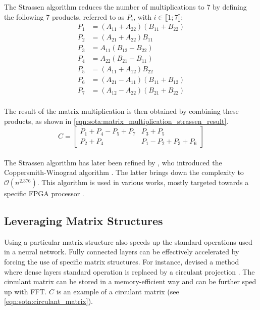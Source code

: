 \noindent The Strassen algorithm reduces the number of multiplications to 7 by
defining the following 7 products, referred to as $P_{i}$, with $i\in \llbracket
1;7 \rrbracket$:\\

\begin{equation}
  \label{eqn:sota:matrix_multiplication_strassen}
  \begin{aligned}
    P_{1} & = (A_{11} + A_{22})(B_{11} + B_{22}) \\
    P_{2} & = (A_{21} + A_{22})B_{11}            \\
    P_{3} & = A_{11}(B_{12} - B_{22})            \\
    P_{4} & = A_{22}(B_{21} - B_{11})            \\
    P_{5} & = (A_{11} + A_{12})B_{22}            \\
    P_{6} & = (A_{21} - A_{11})(B_{11} + B_{12}) \\
    P_{7} & = (A_{12} - A_{22})(B_{21} + B_{22})
  \end{aligned}
\end{equation}\\

\noindent The result of the matrix multiplication is then obtained by combining
these products, as shown in
\cref{eqn:sota:matrix_multiplication_strassen_result}.\\

\begin{equation}
  \label{eqn:sota:matrix_multiplication_strassen_result}
  C = \begin{bmatrix}
    P_{1} + P_{4} - P_{5} + P_{7} & P_{3} + P_{5}                 \\
    P_{2} + P_{4}                 & P_{1} - P_{2} + P_{3} + P_{6}
  \end{bmatrix}
\end{equation}\\

\noindent The Strassen algorithm has later been refined by
\citeauthor{coppersmith1987matrix}, who introduced the Coppersmith-Winograd
algorithm \cite{coppersmith1987matrix}. The latter brings down the complexity to
$\mathcal{O}(n^{2.376})$. This algorithm is used in various works, mostly
targeted towards a specific \ac{FPGA} processor
\cite{liu2018efficient,lu2018spwa,wang2020winonn}.\\

\subsection{Leveraging Matrix Structures}\label{sec:sota:matrix_structures}
Using a particular matrix structure also speeds up the standard operations used
in a neural network. Fully connected layers can be effectively accelerated by
forcing the use of specific matrix structures. For instance,
\citeauthor{DBLP:conf/iccv/ChengYFKCC15} devised a method where dense layers
standard operation is replaced by a circulant projection
\cite{DBLP:conf/iccv/ChengYFKCC15}. The circulant matrix can be stored in a
memory-efficient way and can be further sped up with \ac{FFT}. $C$ is an example
of a circulant matrix (see \cref{eqn:sota:circulant_matrix}).\\

